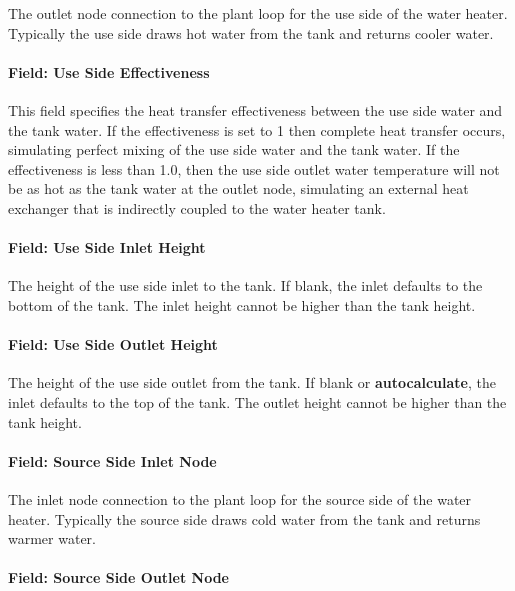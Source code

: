 The outlet node connection to the plant loop for the use side of the water heater. Typically the use side draws hot water from the tank and returns cooler water.

\paragraph{Field: Use Side Effectiveness}\label{field-use-side-effectiveness-1}

This field specifies the heat transfer effectiveness between the use side water and the tank water. If the effectiveness is set to 1 then complete heat transfer occurs, simulating perfect mixing of the use side water and the tank water. If the effectiveness is less than 1.0, then the use side outlet water temperature will not be as hot as the tank water at the outlet node, simulating an external heat exchanger that is indirectly coupled to the water heater tank.

\paragraph{Field: Use Side Inlet Height}\label{field-use-side-inlet-height-000}

The height of the use side inlet to the tank. If blank, the inlet defaults to the bottom of the tank. The inlet height cannot be higher than the tank height.

\paragraph{Field: Use Side Outlet Height}\label{field-use-side-outlet-height-000}

The height of the use side outlet from the tank. If blank or \textbf{autocalculate}, the inlet defaults to the top of the tank. The outlet height cannot be higher than the tank height.

\paragraph{Field: Source Side Inlet Node}\label{field-source-side-inlet-node}

The inlet node connection to the plant loop for the source side of the water heater. Typically the source side draws cold water from the tank and returns warmer water.

\paragraph{Field: Source Side Outlet Node}\label{field-source-side-outlet-node}

